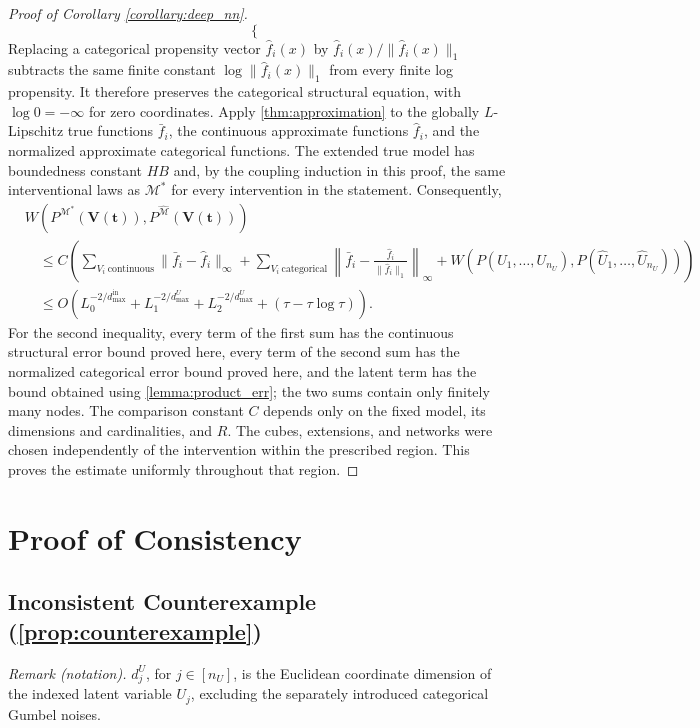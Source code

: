 \begin{proof}[Proof of Corollary \ref{corollary:deep_nn}]
\begin{equation*}
\begin{cases}
\end{cases} 
\end{equation*}
Replacing a categorical propensity vector $\hat f_i(x)$ by $\hat f_i(x)/\|\hat f_i(x)\|_1$ subtracts the same finite constant $\log\|\hat f_i(x)\|_1$ from every finite log propensity. It therefore preserves the categorical structural equation, with $\log0=-\infty$ for zero coordinates. Apply \cref{thm:approximation} to the globally $L$-Lipschitz true functions $\bar f_i$, the continuous approximate functions $\hat f_i$, and the normalized approximate categorical functions. The extended true model has boundedness constant $HB$ and, by the coupling induction in this proof, the same interventional laws as $\mathcal M^*$ for every intervention in the statement. Consequently,
\begin{align*}
&W\left(P^{\mathcal M^*}(\boldsymbol V(\boldsymbol t)),P^{\hat{\mathcal M}}(\boldsymbol V(\boldsymbol t))\right)\\
&\quad\leqslant C\left(\sum_{V_i\ \text{continuous}}\|\bar f_i-\hat f_i\|_\infty
+\sum_{V_i\ \text{categorical}}\left\|\bar f_i-\frac{\hat f_i}{\|\hat f_i\|_1}\right\|_\infty
+W(P(U_1,\ldots,U_{n_U}),P(\hat U_1,\ldots,\hat U_{n_U}))\right)\\
&\quad\leqslant O\left(L_0^{-2/d_{\max}^{\text{in}}}+L_1^{-2/d_{\max}^U}+L_2^{-2/d_{\max}^U}+(\tau-\tau\log\tau)\right).
\end{align*}
For the second inequality, every term of the first sum has the continuous structural error bound proved here, every term of the second sum has the normalized categorical error bound proved here, and the latent term has the bound obtained using \cref{lemma:product_err}; the two sums contain only finitely many nodes. The comparison constant $C$ depends only on the fixed model, its dimensions and cardinalities, and $R$. The cubes, extensions, and networks were chosen independently of the intervention within the prescribed region. This proves the estimate uniformly throughout that region. 
\end{proof}
\section{Proof of Consistency}
\subsection{Inconsistent Counterexample (\cref{prop:counterexample})}\label{subsec:counter}

\noindent\textit{Remark (notation).} $d_j^U$, for $j\in[n_U]$, is the Euclidean coordinate dimension of the indexed latent variable $U_j$, excluding the separately introduced categorical Gumbel noises.


